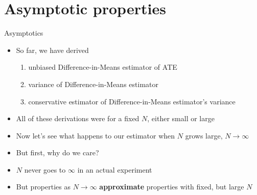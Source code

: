 \documentclass[table, xcolor = {dvipsnames}, 9pt]{beamer}
\theoremstyle{plain}
\begin{document}
\section{Asymptotic properties}
\begin{frame}{Asymptotics}
\vfill
\begin{itemize} \vfill
\item So far, we have derived\vfill
\begin{enumerate} \vfill
\item unbiased Difference-in-Means estimator of ATE \vfill
\item variance of Difference-in-Means estimator \vfill
\item conservative estimator of Difference-in-Means estimator's variance
\vfill\end{enumerate} \vfill \pause
\item All of these derivations were for a fixed $N$, either small or large \vfill
\item Now let's see what happens to our estimator when $N$ grows large, $N \to \infty$ \vfill
\item But first, why do we care? \pause \vfill
\item[] $N$ never goes to $\infty$ in an actual experiment \vfill
\item[] But properties as $N \to \infty$ \textbf{approximate} properties with fixed, but large $N$ \vfill
\end{itemize} \vfill
\end{frame}
\end{document}
